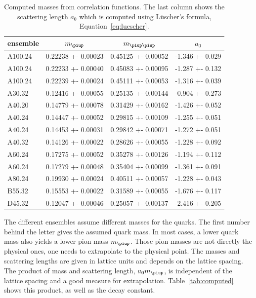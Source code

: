 \documentclass[11pt, english, fleqn, DIV=10, headinclude]{scrartcl}
\newcommand\mpi{m_{\piup}}
\begin{document}
\begin{table}
    \centering
    \begin{tabular}{lSSS}
        ensemble & {$m_{\piup}$}  & {$m_{\piup\piup}$} & {$a_0$} \\
        \midrule
        A100.24 & 0.22238 +- 0.00023 & 0.45125 +- 0.00052 & -1.346 +- 0.029 \\
        A100.24 & 0.22233 +- 0.00040 & 0.45083 +- 0.00095 & -1.287 +- 0.132 \\
        A100.24 & 0.22239 +- 0.00024 & 0.45111 +- 0.00053 & -1.316 +- 0.039 \\
        A30.32  & 0.12416 +- 0.00055 & 0.25135 +- 0.00144 & -0.904 +- 0.273 \\
        A40.20  & 0.14779 +- 0.00078 & 0.31429 +- 0.00162 & -1.426 +- 0.052 \\
        A40.24  & 0.14447 +- 0.00052 & 0.29815 +- 0.00109 & -1.255 +- 0.051 \\
        A40.24  & 0.14453 +- 0.00031 & 0.29842 +- 0.00071 & -1.272 +- 0.051 \\
        A40.32  & 0.14126 +- 0.00022 & 0.28626 +- 0.00055 & -1.228 +- 0.092 \\
        A60.24  & 0.17275 +- 0.00052 & 0.35278 +- 0.00126 & -1.194 +- 0.112 \\
        A60.24  & 0.17279 +- 0.00048 & 0.35404 +- 0.00099 & -1.361 +- 0.091 \\
        A80.24  & 0.19930 +- 0.00024 & 0.40511 +- 0.00057 & -1.228 +- 0.043 \\
        B55.32  & 0.15553 +- 0.00022 & 0.31589 +- 0.00055 & -1.676 +- 0.117 \\
        D45.32  & 0.12047 +- 0.00046 & 0.25057 +- 0.00137 & -2.416 +- 0.205
    \end{tabular}
    \caption{%
        Computed masses from correlation functions. The last column shows the
        scattering length $a_0$ which is computed using Lüscher's formula,
        Equation~\eqref{eq:luescher}.
    }
    \label{tab:masses}
\end{table}

The different ensembles assume different masses for the quarks. The first
number behind the letter gives the assumed quark mass. In most cases, a lower
quark mass also yields a lower pion mass $\mpi$. Those pion masses are not
directly the physical ones, one needs to extrapolate to the physical point. The
masses and scattering lengths are given in lattice units and depends on the
lattice spacing. The product of mass and scattering length, $a_0 \mpi$, is
independent of the lattice spacing and a good measure for extrapolation.
Table~\ref{tab:computed} shows this product, as well as the decay constant.
\end{document}
